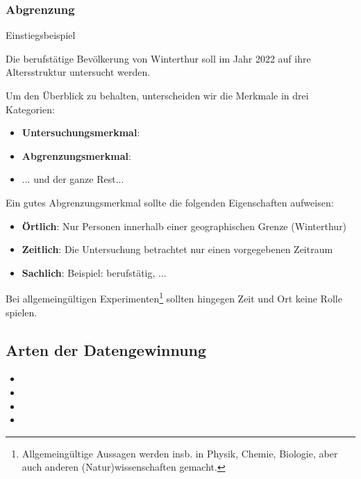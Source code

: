 \subsubsection{Abgrenzung}
Einstiegsbeispiel


Die berufstätige Bevölkerung von Winterthur soll im Jahr 2022 auf ihre
Altersstruktur untersucht werden.



\newpage
Um den Überblick zu behalten, unterscheiden wir die Merkmale in drei
Kategorien:
\begin{itemize}
\item \textbf{Untersuchungsmerkmal}:
\item \textbf{Abgrenzungsmerkmal}:
\item ... und der ganze Rest...

\end{itemize}

Ein gutes Abgrenzungsmerkmal sollte die folgenden Eigenschaften
aufweisen:
\begin{itemize}
\item \textbf{Örtlich}: Nur Personen innerhalb einer geographischen
  Grenze (\zB Winterthur)
\item \textbf{Zeitlich}: Die Untersuchung betrachtet nur einen vorgegebenen
Zeitraum
\item \textbf{Sachlich}: Beispiel: berufstätig, ...
\end{itemize}

Bei allgemeingültigen Experimenten\footnote{Allgemeingültige Aussagen
  werden insb. in Physik, Chemie, Biologie, aber auch anderen
  (Natur)wissenschaften gemacht.} sollten hingegen Zeit und Ort keine Rolle spielen.
\newpage

\subsection{Arten der Datengewinnung}
\begin{itemize}
 \item {}
 \item {}
 \item {}
 \item {}
\end{itemize}

